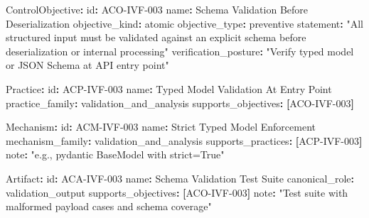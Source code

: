 \documentclass[
]{article}
\newenvironment{Shaded}{}{}
\newcommand{\AttributeTok}[1]{\textcolor[rgb]{0.49,0.56,0.16}{#1}}
\newcommand{\DecValTok}[1]{\textcolor[rgb]{0.25,0.63,0.44}{#1}}
\newcommand{\FunctionTok}[1]{\textcolor[rgb]{0.02,0.16,0.49}{#1}}
\newcommand{\KeywordTok}[1]{\textcolor[rgb]{0.00,0.44,0.13}{\textbf{#1}}}
\newcommand{\StringTok}[1]{\textcolor[rgb]{0.25,0.44,0.63}{#1}}
\begin{document}
\begin{Shaded}
\begin{Highlighting}[]
\FunctionTok{ControlObjective}\KeywordTok{:}
\AttributeTok{  }\FunctionTok{id}\KeywordTok{:}\AttributeTok{ ACO{-}IVF{-}003}
\AttributeTok{  }\FunctionTok{name}\KeywordTok{:}\AttributeTok{ Schema Validation Before Deserialization}
\AttributeTok{  }\FunctionTok{objective\_kind}\KeywordTok{:}\AttributeTok{ atomic}
\AttributeTok{  }\FunctionTok{objective\_type}\KeywordTok{:}\AttributeTok{ preventive}
\AttributeTok{  }\FunctionTok{statement}\KeywordTok{:}\AttributeTok{ }\StringTok{"All structured input must be validated against an explicit schema}
\StringTok{              before deserialization or internal processing"}
\AttributeTok{  }\FunctionTok{verification\_posture}\KeywordTok{:}\AttributeTok{ }\StringTok{"Verify typed model or JSON Schema at API entry point"}

\FunctionTok{Practice}\KeywordTok{:}
\AttributeTok{  }\FunctionTok{id}\KeywordTok{:}\AttributeTok{ ACP{-}IVF{-}003}
\AttributeTok{  }\FunctionTok{name}\KeywordTok{:}\AttributeTok{ Typed Model Validation At Entry Point}
\AttributeTok{  }\FunctionTok{practice\_family}\KeywordTok{:}\AttributeTok{ validation\_and\_analysis}
\AttributeTok{  }\FunctionTok{supports\_objectives}\KeywordTok{:}\AttributeTok{ }\KeywordTok{[}\AttributeTok{ACO{-}IVF}\DecValTok{{-}003}\KeywordTok{]}

\FunctionTok{Mechanism}\KeywordTok{:}
\AttributeTok{  }\FunctionTok{id}\KeywordTok{:}\AttributeTok{ ACM{-}IVF{-}003}
\AttributeTok{  }\FunctionTok{name}\KeywordTok{:}\AttributeTok{ Strict Typed Model Enforcement}
\AttributeTok{  }\FunctionTok{mechanism\_family}\KeywordTok{:}\AttributeTok{ validation\_and\_analysis}
\AttributeTok{  }\FunctionTok{supports\_practices}\KeywordTok{:}\AttributeTok{ }\KeywordTok{[}\AttributeTok{ACP{-}IVF}\DecValTok{{-}003}\KeywordTok{]}
\AttributeTok{  }\FunctionTok{note}\KeywordTok{:}\AttributeTok{ }\StringTok{"e.g., pydantic BaseModel with strict=True"}

\FunctionTok{Artifact}\KeywordTok{:}
\AttributeTok{  }\FunctionTok{id}\KeywordTok{:}\AttributeTok{ ACA{-}IVF{-}003}
\AttributeTok{  }\FunctionTok{name}\KeywordTok{:}\AttributeTok{ Schema Validation Test Suite}
\AttributeTok{  }\FunctionTok{canonical\_role}\KeywordTok{:}\AttributeTok{ validation\_output}
\AttributeTok{  }\FunctionTok{supports\_objectives}\KeywordTok{:}\AttributeTok{ }\KeywordTok{[}\AttributeTok{ACO{-}IVF}\DecValTok{{-}003}\KeywordTok{]}
\AttributeTok{  }\FunctionTok{note}\KeywordTok{:}\AttributeTok{ }\StringTok{"Test suite with malformed payload cases and schema coverage"}
\end{Highlighting}
\end{Shaded}
\end{document}
